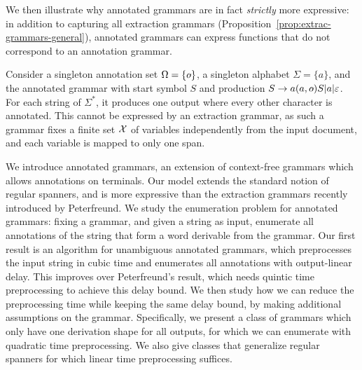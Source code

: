 We then illustrate why annotated grammars are in fact \emph{strictly} more
expressive: in addition to capturing all extraction grammars
(Proposition~\ref{prop:extrac-grammars-general}),
annotated grammars can express functions that do not correspond to an annotation grammar.

%
\begin{example}
  Consider a singleton annotation set $\Omega = \{\oout\}$, a singleton alphabet $\Sigma = \{a\}$, and the annotated grammar with start symbol $S$ and production $S \rightarrow a (a, \oout) S | a | \epsilon$. For each string of $\Sigma^*$, it produces one output where every other character is annotated. This cannot be expressed by an extraction grammar, as such a grammar fixes a finite set $\mathcal{X}$ of variables independently from the input document, and each variable is mapped to only one span.
\end{example}

We introduce annotated grammars, an extension of context-free grammars which allows annotations on terminals. Our model extends the standard notion of regular spanners, and 
is more expressive than the extraction grammars recently introduced by Peterfreund. We study the enumeration problem for annotated grammars: fixing a grammar, and given a string as input, enumerate all annotations of the string that form a word derivable from the grammar. Our first result is an algorithm for unambiguous annotated grammars, which preprocesses the input string in cubic time and enumerates all annotations with output-linear delay. This improves over Peterfreund's result, which needs quintic time preprocessing to achieve this delay bound. We then study how we can reduce the preprocessing time while keeping the same delay bound, by making additional assumptions on the grammar. Specifically, we present a class of grammars which only have one derivation shape for all outputs, for which we can enumerate with quadratic time preprocessing. We also give classes that generalize regular spanners for which linear time preprocessing suffices.


\usepackage{amsmath,MnSymbol}
\usepackage{amsthm}
\usepackage{algorithm}
\usepackage[noend]{algpseudocode}
\usepackage{thmtools}
\usepackage{multicol}
\usepackage{colonequals}
\usepackage{graphicx}
\usepackage{xcolor}


